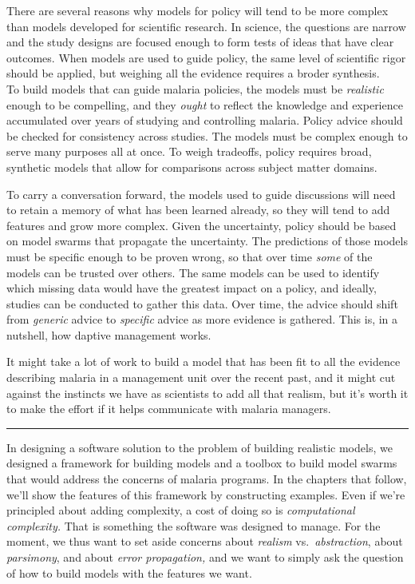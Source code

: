 \documentclass[
]{book}
\begin{document}
There are several reasons why models for policy will tend to be more complex than models developed for scientific research.
In science, the questions are narrow and the study designs are focused enough to form tests of ideas that have clear outcomes.
When models are used to guide policy, the same level of scientific rigor should be applied, but weighing all the evidence requires a broder synthesis.\\
To build models that can guide malaria policies, the models must be \emph{realistic} enough to be compelling, and they \emph{ought} to reflect the knowledge and experience accumulated over years of studying and controlling malaria.
Policy advice should be checked for consistency across studies.
The models must be complex enough to serve many purposes all at once.
To weigh tradeoffs, policy requires broad, synthetic models that allow for comparisons across subject matter domains.

To carry a conversation forward, the models used to guide discussions will need to retain a memory of what has been learned already, so they will tend to add features and grow more complex.
Given the uncertainty, policy should be based on model swarms that propagate the uncertainty.
The predictions of those models must be specific enough to be proven wrong, so that over time \emph{some} of the models can be trusted over others.
The same models can be used to identify which missing data would have the greatest impact on a policy, and ideally, studies can be conducted to gather this data.
Over time, the advice should shift from \emph{generic} advice to \emph{specific} advice as more evidence is gathered.
This is, in a nutshell, how daptive management works.

It might take a lot of work to build a model that has been fit to all the evidence describing malaria in a management unit over the recent past, and it might cut against the instincts we have as scientists to add all that realism, but it's worth it to make the effort if it helps communicate with malaria managers.

\begin{center}\rule{0.5\linewidth}{0.5pt}\end{center}

In designing a software solution to the problem of building realistic models, we designed a framework for building models and a toolbox to build model swarms that would address the concerns of malaria programs. In the chapters that follow, we'll show the features of this framework by constructing examples. Even if we're principled about adding complexity, a cost of doing so is \emph{computational complexity.} That is something the software was designed to manage. For the moment, we thus want to set aside concerns about \emph{realism} vs.~\emph{abstraction}, about \emph{parsimony}, and about \emph{error propagation,} and we want to simply ask the question of how to build models with the features we want.
\end{document}
